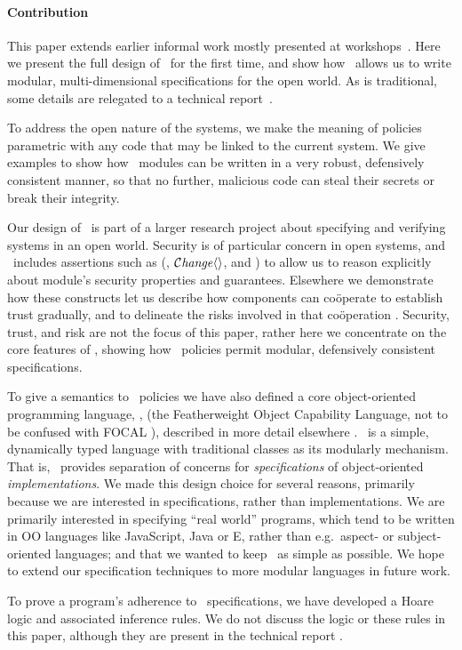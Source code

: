  




\paragraph{Contribution} 
This paper extends earlier informal work mostly presented at
workshops~\cite{capeFTfJP,capeFTfJP14,swapsiesOnTheInternet2015,capeIFM14}.
Here we present the full design of \Chainmail\ for the first time, and
show how \Chainmail\ allows us to write modular, multi-dimensional
specifications for the open world.  As is traditional, some details
are relegated to a technical report~\cite{appendix}.

To address the open nature of the systems, we make the meaning of
policies parametric with any code that may be linked to the
current system.  We give examples to show how \Chainmail\ modules can
be written in a very robust, defensively consistent manner, so that no
further, malicious code can steal their secrets or break their
integrity.


Our design of \Chainmail\ is part of a larger research project about
specifying and verifying systems in an open world.  Security is of
particular concern in open systems, and \Chainmail\ includes
assertions such as (\obeys, $\mathcal{C}\textrm{\textit{hange}}\langle\rangle$, and \MayAccess) to allow
us to reason explicitly about module's security properties and
guarantees.  Elsewhere we demonstrate how these constructs let us
describe how components can co{\"o}perate to establish trust
gradually, and to delineate the risks involved in that co{\"o}peration
\cite{POSTSUBMITTED}. Security, trust, and risk are not the focus of
this paper, rather here we concentrate on the core features of
\Chainmail, showing how \Chainmail\ policies permit modular,
defensively consistent specifications.

To give a semantics to \Chainmail\ policies we have also defined a
core object-oriented programming language, \LangOO, (the Featherweight
Object Capability Language, not to be confused with FOCAL
\cite{FOCAL-69}), described in more detail elsewhere \cite{appendix}.
\LangOO\ is a simple, dynamically typed language with traditional
classes as its modularly mechanism.  That is, \Chainmail\ provides
separation of concerns for \emph{specifications} of object-oriented
\emph{implementations}.  We made this design choice for several
reasons, primarily because we are interested in specifications, rather
than implementations.  We are primarily
interested in specifying ``real world'' programs, which tend to be
written in OO languages like JavaScript, Java or E, rather than e.g.\
aspect- or subject- oriented languages; and that we wanted to keep
\LangOO\ as simple as possible.  We hope to extend our specification
techniques to more modular languages in future work.

To prove a program's adherence to \Chainmail\ specifications, we have
developed a Hoare logic and associated inference rules.  We do not
discuss the logic or these rules in this paper, although they are
present in the technical report \cite{appendix}.
 
